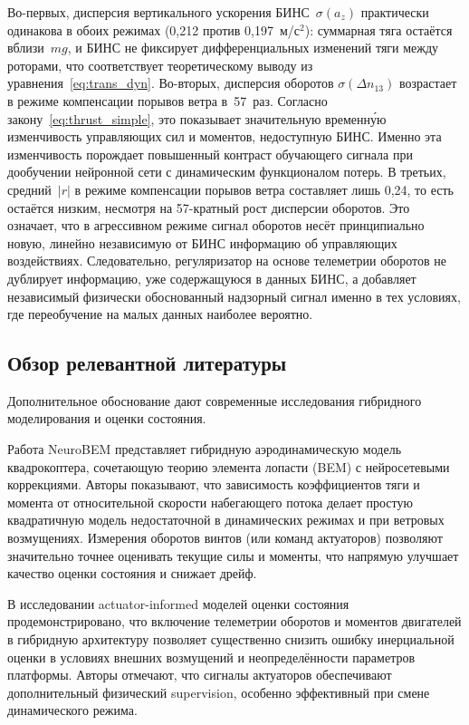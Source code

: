 Во-первых, дисперсия вертикального ускорения БИНС~$\sigma(a_z)$ практически одинакова
в обоих режимах (0{,}212 против 0{,}197~м/с$^2$): суммарная тяга остаётся
вблизи~$mg$, и БИНС не фиксирует дифференциальных изменений тяги между
роторами, что соответствует теоретическому выводу из
уравнения~\eqref{eq:trans_dyn}.
Во-вторых, дисперсия оборотов $\sigma(\Delta n_{13})$ возрастает в режиме компенсации
порывов ветра в~57~раз.
Согласно закону~\eqref{eq:thrust_simple}, это показывает значительную временну́ю
изменчивость управляющих сил и моментов, недоступную БИНС.
Именно эта изменчивость порождает повышенный контраст обучающего сигнала
при дообучении нейронной сети с динамическим функционалом потерь.
В третьих, средний~$|r|$ в режиме компенсации порывов ветра составляет лишь 0{,}24,
то есть остаётся низким, несмотря на 57-кратный рост дисперсии оборотов.
Это означает, что в агрессивном режиме сигнал оборотов несёт принципиально
новую, линейно независимую от БИНС информацию об управляющих воздействиях.
Следовательно, регуляризатор на основе телеметрии оборотов не дублирует
информацию, уже содержащуюся в данных БИНС, а добавляет независимый
физически обоснованный надзорный сигнал именно в тех условиях, где
переобучение на малых данных наиболее вероятно.

\subsection{Обзор релевантной литературы}

Дополнительное обоснование дают современные исследования гибридного моделирования и оценки состояния.

Работа NeuroBEM \cite{neurobem2021} представляет гибридную аэродинамическую модель квадрокоптера, сочетающую теорию элемента лопасти (BEM) с нейросетевыми коррекциями. Авторы показывают, что зависимость коэффициентов тяги и момента от относительной скорости набегающего потока делает простую квадратичную модель недостаточной в динамических режимах и при ветровых возмущениях. Измерения оборотов винтов (или команд актуаторов) позволяют значительно точнее оценивать текущие силы и моменты, что напрямую улучшает качество оценки состояния и снижает дрейф.

В исследовании actuator-informed моделей оценки состояния \cite{actuator_informed2022} продемонстрировано, что включение телеметрии оборотов и моментов двигателей в гибридную архитектуру позволяет существенно снизить ошибку инерциальной оценки в условиях внешних возмущений и неопределённости параметров платформы. Авторы отмечают, что сигналы актуаторов обеспечивают дополнительный физический supervision, особенно эффективный при смене динамического режима.

